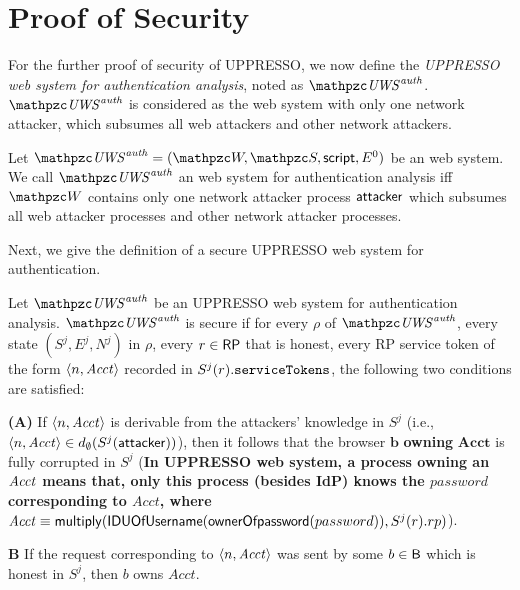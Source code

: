   
  
\section{Proof of Security}
For the further proof of security of UPPRESSO, we now define the \emph{UPPRESSO web system for authentication analysis}, noted as $\mi{\uppressoauthwebsystem}$.  $\mi{\uppressoauthwebsystem}$ is considered as the \uppresso web system with only one network attacker, which subsumes all web attackers and other network attackers.  
  
  
  \begin{definition}
    Let $\mi{\uppressoauthwebsystem} = (\bidsystem, \scriptset, \mathsf{script}, E^0)$ be
    an \uppresso web system. We call $\mi{\uppressoauthwebsystem}$ an
    \uppresso web system for authentication analysis iff
    $\bidsystem$ contains only one network attacker process
    $\mathsf{attacker}$ which subsumes all web attacker processes and other network attacker processes.
  \end{definition}
  
  
  Next, we give the definition of a secure UPPRESSO web system for authentication. 
  
  \begin{definition}
  Let $\mi{\uppressoauthwebsystem}$ be an UPPRESSO web system for authentication analysis. $\mi{\uppressoauthwebsystem}$ is secure if for every $\rho$ of $\mi{\uppressoauthwebsystem}$, every state $(S^j, E^j, N^j)$ in $\rho$, every $r\in \mathsf{RP}$ that is honest, every RP service token of the form $\langle n, \mathit{Acct}\rangle$ recorded in  $S^j(r).\mathtt{serviceTokens}$, the following two conditions are satisfied:
   
   \textbf{(A)} If $\langle n,\mathit{Acct}\rangle$ is derivable from the attackers' knowledge in $S^j$ (i.e., $\langle n,\mathit{Acct}\rangle \in d_{\emptyset}(S^j(\mathsf{attacker}))$), then it follows that the browser $\boldsymbol{b}$ \textbf{owning} $\boldsymbol{Acct}$ is fully corrupted in $S^j$ (\textbf{In UPPRESSO web system, a process owning an $\mathit{Acct}$ means that, only this process (besides IdP) knows the $password$ corresponding to $Acct$, where $\mathit{Acct} \equiv \mathsf{multiply}(\mathsf{IDUOfUsername} (\mathsf{ownerOfpassword}(password)), S^j(r).rp)$}).
   
   \textbf{{B}} If the request corresponding to $\langle n,\mathit{Acct}\rangle$ was sent by  some $b\in \mathsf{B}$ which is honest in $S^j$, then $b$ owns $Acct$.
  \end{definition}


